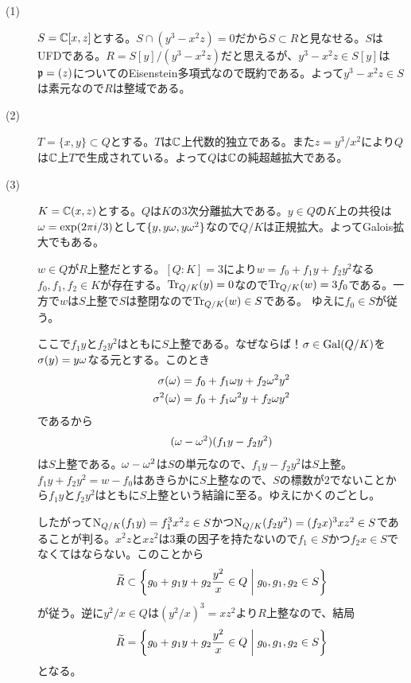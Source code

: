 \begin{sol} ${}$
  \begin{description}
    \item[(1)] $S = {\mathbb C}[x,z]$とする。$S \cap (y^3 - x^2 z) = 0$だから$S \subset R$と見なせる。$S$はUFDである。$R = S[y]/(y^3 - x^2z)$だと思えるが、$y^3 - x^2 z \in S[y]$は$\mathfrak{p} = (z)$についてのEisenstein多項式なので既約である。よって$y^3 - x^2 z \in S$は素元なので$R$は整域である。
    \item[(2)] $T=\{ x,y \} \subset Q$とする。$T$は${\mathbb C}$上代数的独立である。また$z = y^3/x^2$により$Q$は${\mathbb C}$上$T$で生成されている。よって$Q$は${\mathbb C}$の純超越拡大である。
    \item[(3)] $K = {\mathbb C}(x,z)$とする。$Q$は$K$の$3$次分離拡大である。$y \in Q$の$K$上の共役は${\omega} = \exp(2 \pi i/3)$として$\{ y, y{\omega}, y {\omega}^2 \}$なので$Q/K$は正規拡大。よってGalois拡大でもある。

    $w \in Q$が$R$上整だとする。$[Q : K ]= 3$により$w = f_0 + f_1 y + f_2 y^2$なる$f_0, f_1 , f_2 \in K$が存在する。$\operatorname{Tr}_{Q/K}(y)=0$なので$\operatorname{Tr}_{Q/K}(w) = 3f_0$である。一方で$w$は$S$上整で$S$は整閉なので$\operatorname{Tr}_{Q/K}(w) \in S$である。
    ゆえに$f_0 \in S$が従う。

    ここで$f_1 y$と$f_2 y^2$はともに$S$上整である。なぜならば！${\sigma} \in \operatorname{Gal}(Q/K)$を${\sigma}(y) = y {\omega}$なる元とする。このとき
    \begin{align*}
      {\sigma}({\omega}) &= f_0 + f_1 {\omega} y + f_2 {\omega}^2 y^2 \\
      {\sigma}^2({\omega}) &= f_0 + f_1 {\omega}^2 y + f_2 {\omega} y^2
    \end{align*}
    であるから
    \begin{align*}
    ({\omega} - {\omega}^2)( f_1  y - f_2 y^2)
    \end{align*}
    は$S$上整である。${\omega} - {\omega}^2$は$S$の単元なので、$f_1 y - f_2 y^2$は$S$上整。$f_1 y + f_2 y^2 = w - f_0$はあきらかに$S$上整なので、$S$の標数が$2$でないことから$f_1 y $と$f_2 y^2$はともに$S$上整という結論に至る。ゆえにかくのごとし。

    したがって$\operatorname{N}_{Q/K}(f_1 y) = f_1^3 x^2 z \in S$かつ$\operatorname{N}_{Q/K}(f_2 y^2) = (f_2 x)^3 xz^2 \in S$であることが判る。$x^2z$と$xz^2$は$3$乗の因子を持たないので$f_1 \in S$かつ$f_2 x \in S$でなくてはならない。このことから
    \[
    \widetilde{R} \subset \left\{  g_0 + g_1 y + g_2 \frac{y^2}{x} \in Q  \mathrel{} \middle| \mathrel{}  g_0, g_1 , g_2 \in S \right\}
    \]
    が従う。逆に$y^2 /x \in Q$は$(y^2 /x)^3 = xz^2$より$R$上整なので、結局
    \[
    \widetilde{R} = \left\{  g_0 + g_1 y + g_2 \frac{y^2}{x} \in Q  \mathrel{} \middle| \mathrel{}  g_0, g_1 , g_2 \in S \right\}
    \]
    となる。
  \end{description}
\end{sol}
